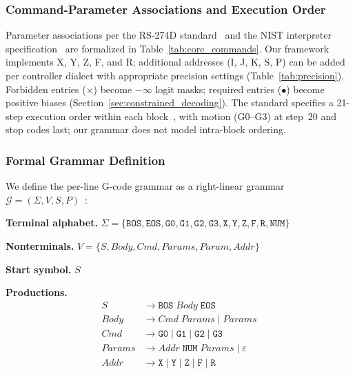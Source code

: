 \documentclass[sensors,article,submit,moreauthors,pdftex]{Definitions/mdpi}
\begin{document}
\subsubsection{Command-Parameter Associations and Execution Order}

Parameter associations per the RS-274D standard~\cite{rs274d} and the NIST interpreter specification~\cite{nist_ngc} are formalized in Table~\ref{tab:core_commands}. Our framework implements X, Y, Z, F, and R; additional addresses (I, J, K, S, P) can be added per controller dialect with appropriate precision settings (Table~\ref{tab:precision}). Forbidden entries ($\times$) become $-\infty$ logit masks; required entries ($\bullet$) become positive biases (Section~\ref{sec:constrained_decoding}). The standard specifies a 21-step execution order within each block~\cite{nist_ngc}, with motion (G0--G3) at step~20 and stop codes last; our grammar does not model intra-block ordering.

\subsubsection{Formal Grammar Definition}
\label{sec:formal_grammar}

We define the per-line G-code grammar as a right-linear grammar $\mathcal{G} = (\Sigma, V, S, P)$~\cite{sipser}:

\smallskip\noindent\textbf{Terminal alphabet.}
$\Sigma = \{\texttt{BOS}, \texttt{EOS}, \texttt{G0}, \texttt{G1}, \texttt{G2}, \texttt{G3}, \texttt{X}, \texttt{Y}, \texttt{Z}, \texttt{F}, \texttt{R}, \texttt{NUM}\}$

\smallskip\noindent\textbf{Nonterminals.}
$V = \{S, \mathit{Body}, \mathit{Cmd}, \mathit{Params}, \mathit{Param}, \mathit{Addr}\}$

\smallskip\noindent\textbf{Start symbol.} $S$

\smallskip\noindent\textbf{Productions.}
\begin{align*}
S &\to \texttt{BOS}\; \mathit{Body}\; \texttt{EOS} \\
\mathit{Body} &\to \mathit{Cmd}\; \mathit{Params} \mid \mathit{Params} \\
\mathit{Cmd} &\to \texttt{G0} \mid \texttt{G1} \mid \texttt{G2} \mid \texttt{G3} \\
\mathit{Params} &\to \mathit{Addr}\; \texttt{NUM}\; \mathit{Params} \mid \varepsilon \\
\mathit{Addr} &\to \texttt{X} \mid \texttt{Y} \mid \texttt{Z} \mid \texttt{F} \mid \texttt{R}
\end{align*}
\end{document}
